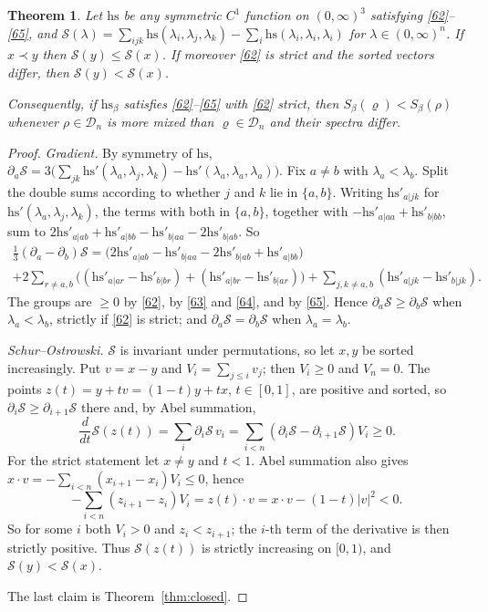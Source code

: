 \documentclass[11pt]{amsart}
\newtheorem{theorem}{Theorem}[section]
\theoremstyle{definition}
\numberwithin{equation}{section}
\newcommand{\Dn}{\mathcal{D}_n}
\newcommand{\hs}{\mathrm{hs}}
\begin{document}
\begin{theorem}\label{thm:reduction}
Let $\hs$ be any symmetric $C^1$ function on $(0,\infty)^3$ satisfying \eqref{62}--\eqref{65}, and
$\mathcal S(\lambda)=\sum_{ijk}\hs(\lambda_i,\lambda_j,\lambda_k)-\sum_i\hs(\lambda_i,\lambda_i,\lambda_i)$ for $\lambda\in(0,\infty)^n$. If $x\prec y$ then $\mathcal S(y)\le\mathcal S(x)$. If moreover \eqref{62} is
strict and the sorted vectors differ, then $\mathcal S(y)<\mathcal S(x)$.

Consequently, if $\hs_\beta$ satisfies \eqref{62}--\eqref{65} with \eqref{62} strict, then $S_\beta(\varrho)<S_\beta(\rho)$ whenever $\rho\in\Dn$ is more mixed than $\varrho\in\Dn$ and
their spectra differ.
\end{theorem}
\begin{proof}
\emph{Gradient.} By symmetry of $\hs$, $\partial_a\mathcal S=3\big(\sum_{jk}\hs'(\lambda_a,\lambda_j,\lambda_k)-\hs'(\lambda_a,\lambda_a,\lambda_a)\big)$. Fix $a\neq b$ with
$\lambda_a<\lambda_b$. Split the double sums according to whether $j$ and $k$ lie in $\{a,b\}$. Writing $\hs'_{a|jk}$ for $\hs'(\lambda_a,\lambda_j,\lambda_k)$, the terms with both
in $\{a,b\}$, together with $-\hs'_{a|aa}+\hs'_{b|bb}$, sum to
$2\hs'_{a|ab}+\hs'_{a|bb}-\hs'_{b|aa}-2\hs'_{b|ab}$. So
\begin{multline}\label{eq:dittmann}
\tfrac13(\partial_a-\partial_b)\mathcal S=\big(2\hs'_{a|ab}-\hs'_{b|aa}-2\hs'_{b|ab}+\hs'_{a|bb}\big)\\
+2\sum_{r\ne a,b}\big((\hs'_{a|ar}-\hs'_{b|br})+(\hs'_{a|br}-\hs'_{b|ar})\big)+\sum_{j,k\ne a,b}(\hs'_{a|jk}-\hs'_{b|jk}).
\end{multline}
The groups are $\ge0$ by \eqref{62}, by \eqref{63} and \eqref{64}, and by \eqref{65}. Hence $\partial_a\mathcal S\ge\partial_b\mathcal S$ when $\lambda_a<\lambda_b$, strictly if \eqref{62} is
strict; and $\partial_a\mathcal S=\partial_b\mathcal S$ when $\lambda_a=\lambda_b$.

\emph{Schur--Ostrowski.} $\mathcal S$ is invariant under permutations, so let $x,y$ be sorted increasingly. Put $v=x-y$ and $V_i=\sum_{j\le i}v_j$; then $V_i\ge0$ and $V_n=0$. The points
$z(t)=y+tv=(1-t)y+tx$, $t\in[0,1]$, are positive and sorted, so $\partial_i\mathcal S\ge\partial_{i+1}\mathcal S$ there and, by Abel summation,
\[\frac{d}{dt}\mathcal S(z(t))=\sum_i\partial_i\mathcal S\,v_i=\sum_{i<n}(\partial_i\mathcal S-\partial_{i+1}\mathcal S)V_i\ge0 .\]
For the strict statement let $x\ne y$ and $t<1$. Abel summation also gives $x\cdot v=-\sum_{i<n}(x_{i+1}-x_i)V_i\le0$, hence
\[-\sum_{i<n}(z_{i+1}-z_i)V_i=z(t)\cdot v=x\cdot v-(1-t)|v|^2<0 .\]
So for some $i$ both $V_i>0$ and $z_i<z_{i+1}$; the $i$-th term of the derivative is then strictly positive. Thus $\mathcal S(z(t))$ is strictly increasing on $[0,1)$,
and $\mathcal S(y)<\mathcal S(x)$.

The last claim is Theorem~\ref{thm:closed}.
\end{proof}
\end{document}
